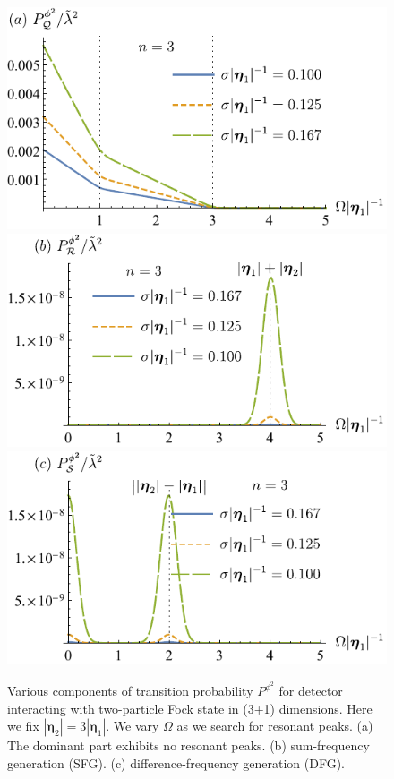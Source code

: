 \documentclass[11pt,prd,onecolumn,superscriptaddress,nofootinbib,floatfix,amsmath,amssymb]{revtex4-2}
\newcommand{\ba}{{\bm{\eta}_1}}
\newcommand{\bb}{{\bm{\eta}_2}}
\begin{document}
        
    \begin{figure}[tp]
        \centering
        \includegraphics[scale=0.64]{Fig5a.pdf}
        \includegraphics[scale=0.64]{Fig5b.pdf}
        \includegraphics[scale=0.64]{Fig5c.pdf}
        \caption{Various components of transition probability $P^{\phi^2}$ for detector interacting with two-particle Fock state in (3+1) dimensions. Here we fix $|\bb|=3|\ba|$. We vary $\Omega$ as we search for resonant peaks. (a) The dominant part exhibits no resonant peaks. (b) sum-frequency generation (SFG). (c) difference-frequency generation (DFG).}
        \label{fig: quad-resonance-QRS-3D}
    \end{figure}    
 
\end{document}
